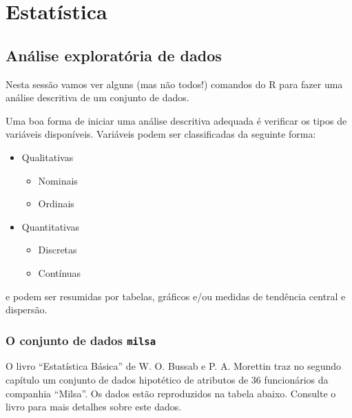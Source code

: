 \documentclass[10pt,a4paper]{book}
\providecommand{\tightlist}{%
  \setlength{\itemsep}{0pt}\setlength{\parskip}{0pt}}
\begin{document}
\part{Estatística}\label{part-estatuxedstica}

\chapter{Análise exploratória de
dados}\label{anuxe1lise-exploratuxf3ria-de-dados}

Nesta sessão vamos ver alguns (mas não todos!) comandos do R para fazer
uma análise descritiva de um conjunto de dados.

Uma boa forma de iniciar uma análise descritiva adequada é verificar os
tipos de variáveis disponíveis. Variáveis podem ser classificadas da
seguinte forma:

\begin{itemize}
\tightlist
\item
  Qualitativas

  \begin{itemize}
  \tightlist
  \item
    Nominais
  \item
    Ordinais
  \end{itemize}
\item
  Quantitativas

  \begin{itemize}
  \tightlist
  \item
    Discretas
  \item
    Contínuas
  \end{itemize}
\end{itemize}

e podem ser resumidas por tabelas, gráficos e/ou medidas de tendência
central e dispersão.

\section{\texorpdfstring{O conjunto de dados
\texttt{milsa}}{O conjunto de dados milsa}}\label{o-conjunto-de-dados-milsa}

O livro ``Estatística Básica'' de W. O. Bussab e P. A. Morettin traz no
segundo capítulo um conjunto de dados hipotético de atributos de 36
funcionários da companhia ``Milsa''. Os dados estão reproduzidos na
tabela abaixo. Consulte o livro para mais detalhes sobre este dados.
\end{document}
